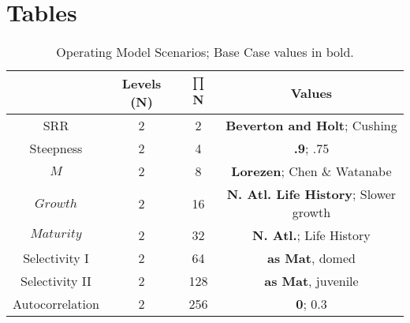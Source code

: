 \documentclass[%
nonumbib,      %
%
]{nrc1}                          %
\begin{document}
\newpage
\section*{Tables}
\clearpage
\begin{table}
\begin{center}
\label{tab:datasumm}
\begin{tabular}{|cccc|}
\hline
			& {\tiny Levels (N)} & {\tiny $\prod$ N} & {\tiny Values} \\ %
\hline\hline
{\tiny SRR} 		& {\tiny 2} 	 & {\tiny   2}  & {\tiny  \textbf{Beverton and Holt}; Cushing}     \\%
{\tiny Steepness}	& {\tiny 2} 	 & {\tiny   4}  & {\tiny  \textbf{.9}; .75}                        \\%
{\tiny $M$} 		& {\tiny 2} 	 & {\tiny   8}  & {\tiny  \textbf{Lorezen}; Chen \& Watanabe} 	   \\%
{\tiny $Growth$} 	& {\tiny 2} 	 & {\tiny  16}  & {\tiny  \textbf{N. Atl. Life History}; Slower growth}\\%
{\tiny $Maturity$} 	& {\tiny 2} 	 & {\tiny  32}  & {\tiny  \textbf{N. Atl.}; Life History}      \\%
{\tiny Selectivity I}	& {\tiny 2} 	 & {\tiny  64}  & {\tiny  \textbf{as Mat}, domed}      		   \\%
{\tiny Selectivity II}	& {\tiny 2} 	 & {\tiny 128}  & {\tiny  \textbf{as Mat}, juvenile}   		   \\%
{\tiny Autocorrelation}	& {\tiny 2} 	 & {\tiny 256}  & {\tiny  \textbf{0}; 0.3}                        \\%
\hline
\end{tabular}
\end{center}
\label{tab:grid}
\caption{Operating Model Scenarios; Base Case values in bold.}  
\end{table}
\end{document}
